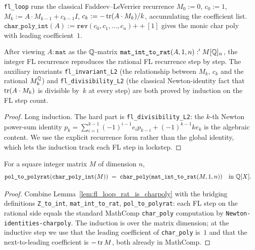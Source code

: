 \begin{definition}[FL recurrence]\label{def:fl_loop}
\rocqok
{}
\texttt{fl\_loop} runs the classical Faddeev--LeVerrier recurrence
$M_0 := 0$, $c_0 := 1$, $M_k := A \cdot M_{k-1} + c_{k-1} I$,
$c_k := -\operatorname{tr}(A \cdot M_k)/k$, accumulating the coefficient list.
$\texttt{char\_poly\_int}(A) := \texttt{rev}(c_0, c_1, \ldots, c_n) \mathrel{++} [1]$
gives the monic char poly with leading coefficient~$1$.
\end{definition}

\begin{lemma}\label{lem:fl_loop_rat_is_charpoly}
\rocqok
{}
After viewing $A : \texttt{mat}$ as the $\mathbb{Q}$-matrix
$\texttt{mat\_int\_to\_rat}(A, 1, n) : 'M[\mathbb{Q}]_n$, the integer FL
recurrence reproduces the rational FL recurrence step by step. The
auxiliary invariants \texttt{fl\_invariant\_L2} (the
relationship between $M_k$, $c_k$ and the rational $M_k^{\mathbb{Q}}$) and
\texttt{fl\_divisibility\_L2} (the classical Newton-identity fact that
$\operatorname{tr}(A \cdot M_k)$ is divisible by~$k$ at every step) are both
proved by induction on the FL step count.
\end{lemma}
\begin{proof}\rocqok
Long induction. The hard part is \texttt{fl\_divisibility\_L2}: the
$k$-th Newton power-sum identity
$p_k = \sum_{i=1}^{k-1}(-1)^{i-1} e_i p_{k-i} + (-1)^{k-1} k e_k$
is the algebraic content. We use the explicit recurrence form rather
than the global identity, which lets the induction track each FL step
in lockstep.
\end{proof}

\begin{theorem}\label{thm:char_poly_int_correct}
\rocqok
{}
For a square integer matrix $M$ of dimension $n$,
\[
\texttt{pol\_to\_polyrat}(\texttt{char\_poly\_int}(M))
   \;=\; \texttt{char\_poly}(\texttt{mat\_int\_to\_rat}(M, 1, n))
   \quad\text{in } \mathbb{Q}[X].
\]
\end{theorem}
\begin{proof}\rocqok
Combine Lemma~\ref{lem:fl_loop_rat_is_charpoly} with the bridging
definitions \texttt{Z\_to\_int}, \texttt{mat\_int\_to\_rat},
\texttt{pol\_to\_polyrat}: each FL step on the rational side equals
the standard MathComp \texttt{char\_poly} computation by
\texttt{Newton-identities-charpoly}. The induction is over the matrix
dimension; at the inductive step we use that the leading coefficient
of \texttt{char\_poly} is~$1$ and that the next-to-leading coefficient
is $-\operatorname{tr} M$, both already in MathComp.
\end{proof}

